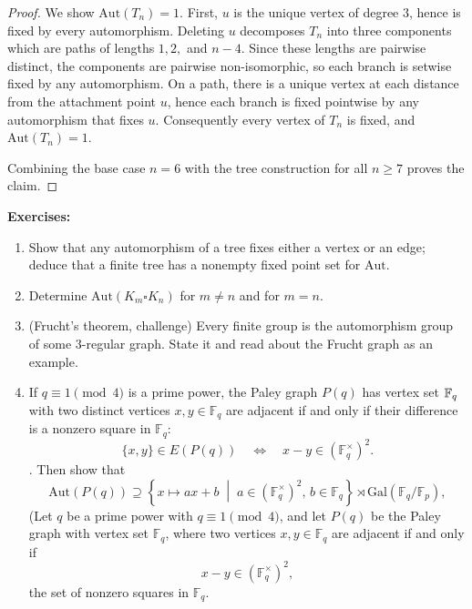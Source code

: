 \documentclass[12pt,a4paper,openany]{book}
\newcommand{\Aut}{\mathrm{Aut}}
\begin{document}
\begin{proof}
We show $\mathrm{Aut}(T_n)=1$. First, $u$ is the unique vertex of degree $3$, hence is fixed by
every automorphism. Deleting $u$ decomposes $T_n$ into three components which are paths of
lengths $1,2,$ and $n-4$. Since these lengths are pairwise distinct, the components are
pairwise non-isomorphic, so each branch is setwise fixed by any automorphism. On a path,
there is a unique vertex at each distance from the attachment point $u$, hence each branch
is fixed pointwise by any automorphism that fixes $u$. Consequently every vertex of $T_n$
is fixed, and $\mathrm{Aut}(T_n)=1$.

\smallskip
Combining the base case $n=6$ with the tree construction for all $n\ge 7$ proves the claim.
\end{proof}


\textbf{Exercises:}
\begin{enumerate}
  \item Show that any automorphism of a tree fixes either a vertex or an edge; deduce that a finite tree has a nonempty fixed point set for $\mathrm{Aut}$.
  \item Determine $\mathrm{Aut}(K_{m}\square K_n)$ for $m\neq n$ and for $m=n$.
  \item (Frucht’s theorem, challenge) Every finite group is the automorphism group of some $3$-regular graph. State it and read about the Frucht graph as an example.
  
  \item If $q\equiv 1 \pmod 4$ is a prime power, the Paley graph $P(q)$ has vertex set $\Bbb F_q$ with two distinct vertices $x, y \in \mathbb{F}_q$ are adjacent if and only if their difference is a nonzero square in $\mathbb{F}_q$:
\[
\{x, y\} \in E(P(q)) \quad \iff \quad x - y \in (\mathbb{F}_q^\times)^2.
\]. Then show that
\[
\mathrm{Aut}(P(q)) \supseteq \left\{ x \mapsto a x + b \;\middle|\; a \in (\mathbb{F}_q^\times)^2,\, b \in \mathbb{F}_q \right\} \rtimes \mathrm{Gal}(\mathbb{F}_q/\mathbb{F}_p),
\]
(Let $q$ be a prime power with $q \equiv 1 \pmod 4$, and let $P(q)$ be the Paley graph with vertex set $\mathbb{F}_q$, where two vertices $x,y \in \mathbb{F}_q$ are adjacent if and only if
\[
x-y \in (\mathbb{F}_q^\times)^2,
\]
the set of nonzero squares in $\mathbb{F}_q$.




\end{enumerate}
\end{document}

